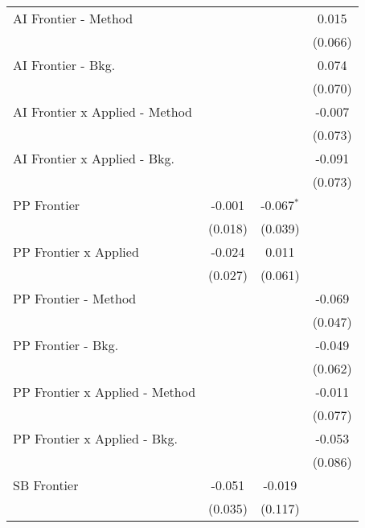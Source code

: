 \begin{tabular}{lccc}
   AI Frontier - Method           &              &               & 0.015\\   
                                  &              &               & (0.066)\\   
   AI Frontier - Bkg.             &              &               & 0.074\\   
                                  &              &               & (0.070)\\   
   AI Frontier x Applied - Method &              &               & -0.007\\   
                                  &              &               & (0.073)\\   
   AI Frontier x Applied - Bkg.   &              &               & -0.091\\   
                                  &              &               & (0.073)\\   
   PP Frontier                    & -0.001       & -0.067$^{*}$  &   \\   
                                  & (0.018)      & (0.039)       &   \\   
   PP Frontier x Applied          & -0.024       & 0.011         &   \\   
                                  & (0.027)      & (0.061)       &   \\   
   PP Frontier - Method           &              &               & -0.069\\   
                                  &              &               & (0.047)\\   
   PP Frontier - Bkg.             &              &               & -0.049\\   
                                  &              &               & (0.062)\\   
   PP Frontier x Applied - Method &              &               & -0.011\\   
                                  &              &               & (0.077)\\   
   PP Frontier x Applied - Bkg.   &              &               & -0.053\\   
                                  &              &               & (0.086)\\   
   SB Frontier                    & -0.051       & -0.019        &   \\   
                                  & (0.035)      & (0.117)       &   \\   

\end{tabular}
